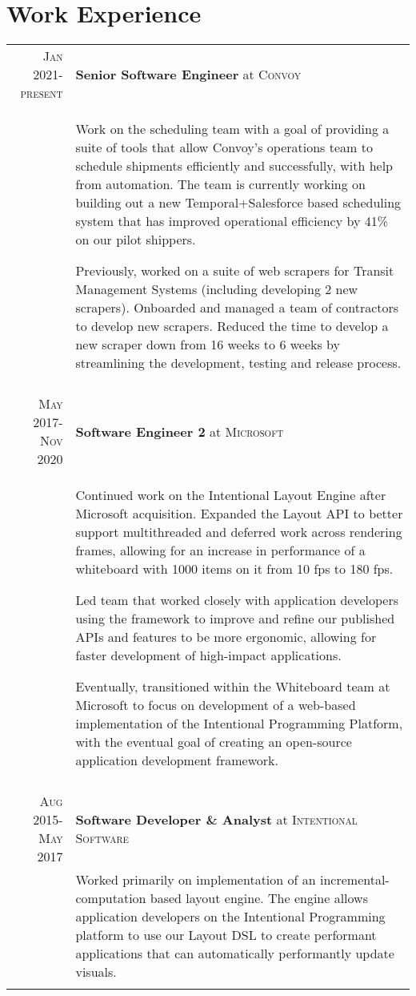 \documentclass[letterpaper,10pt]{article} %
\newcommand{\work}[4]{ \textsc{#1} & \textbf{#2} at \textsc{#3}\\
& #4\\
\multicolumn{2}{c}{} \\}
\begin{document}
\section{Work Experience}

\begin{tabular}{r|p{14.5cm}} %


\work{Jan 2021-present}{Senior Software Engineer}{Convoy}{
 Work on the scheduling team with a goal of providing a suite of tools that allow Convoy's operations team to schedule shipments efficiently and successfully, with help from automation. The team is currently working on building out a new Temporal+Salesforce based scheduling system that has improved operational efficiency by 41\% on our pilot shippers.

Previously, worked on a suite of web scrapers for Transit Management Systems (including developing 2 new scrapers). Onboarded and managed a team of contractors to develop new scrapers. Reduced the time to develop a new scraper down from 16 weeks to 6 weeks by streamlining the development, testing and release process.
}


\work{May 2017-Nov 2020}{Software Engineer 2}{Microsoft}{
  Continued work on the Intentional Layout Engine after Microsoft acquisition. Expanded the Layout API to better support multithreaded and deferred work across rendering frames, allowing for an increase in performance of a whiteboard with 1000 items on it from 10 fps to 180 fps.

  Led team that worked closely with application developers using the framework to improve and refine our published APIs and features to be more ergonomic, allowing for faster development of high-impact applications.

Eventually, transitioned within the Whiteboard team at Microsoft to focus on development of a web-based implementation of the Intentional Programming Platform, with the eventual goal of creating an open-source application development framework.
}


\work{Aug 2015-May 2017}{Software Developer \& Analyst}{Intentional Software}{
  Worked primarily on implementation of an incremental-computation based layout engine. The engine allows application developers on the Intentional Programming
  platform to use our Layout DSL to create performant applications that can automatically performantly update visuals. 

}
\end{tabular}
\end{document}
